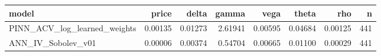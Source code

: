\begin{tabular}{lrrrrrrr}
\toprule
model & price & delta & gamma & vega & theta & rho & n \\
\midrule
PINN_ACV_log_learned_weights & 0.00135 & 0.01273 & 2.61941 & 0.00595 & 0.04684 & 0.00125 & 441 \\
ANN_IV_Sobolev_v01 & 0.00006 & 0.00374 & 0.54704 & 0.00665 & 0.01100 & 0.00029 & 441 \\
\bottomrule
\end{tabular}
